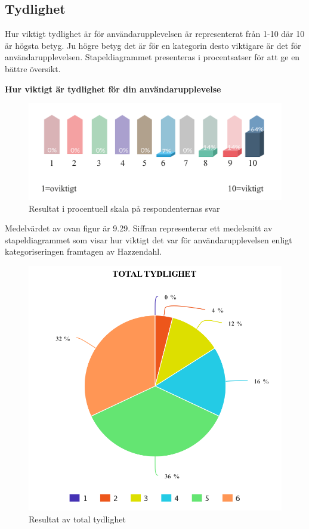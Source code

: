 \subsection{Tydlighet}
Hur viktigt tydlighet är för användarupplevelsen är representerat från 1-10 där 10 är högsta betyg. Ju högre betyg det är för en kategorin desto viktigare är det för användarupplevelsen. Stapeldiagrammet presenteras i procentsatser för att ge en bättre översikt. 
\newline

\centerline{\textbf{Hur viktigt är tydlighet för 
din användarupplevelse}}
\begin{figure} [H] 
  \centering
  \includegraphics[scale=0.7]{Rityta_10.pdf}
\centering
\captionsetup{justification=centering,margin=2cm}
\caption{Resultat i procentuell skala på respondenternas svar}
\end{figure} 

Medelvärdet av ovan figur är 9.29. Siffran representerar ett medelsnitt av stapeldiagrammet som visar hur viktigt det var för användarupplevelsen enligt kategoriseringen framtagen av Hazzendahl. 


\begin{figure} [H]
  \centering
  \includegraphics[scale=0.4]{meta-chart-2.png}
 \captionsetup{justification=centering,margin=2cm}
 \caption{Resultat av total tydlighet}
\end{figure} 




